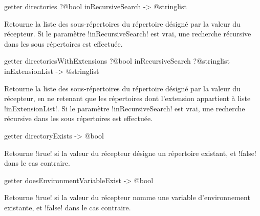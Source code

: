 
\begin{galgasbox}
getter directories ?@bool inRecursiveSearch -> @stringlist
\end{galgasbox}

Retourne la liste des sous-répertoires du répertoire désigné par la valeur du récepteur. Si le paramètre \ggs!inRecursiveSearch! est vrai, une recherche récursive dans les sous répertoires est effectuée.










\begin{galgasbox}
getter directoriesWithExtensions
    ?@bool inRecursiveSearch
    ?@stringlist inExtensionList -> @stringlist
\end{galgasbox}

Retourne la liste des sous-répertoires du répertoire désigné par la valeur du récepteur, en ne retenant que les répertoires dont l'extension appartient à liste \ggs!inExtensionList!. Si le paramètre \ggs!inRecursiveSearch! est vrai, une recherche récursive dans les sous répertoires est effectuée.









\begin{galgasbox}
getter directoryExists -> @bool
\end{galgasbox}

Retourne \ggs!true! si la valeur du récepteur désigne un répertoire existant, et \ggs!false! dans le cas contraire.









\begin{galgasbox}
getter doesEnvironmentVariableExist -> @bool
\end{galgasbox}

Retourne \ggs!true! si la valeur du récepteur nomme une variable d'environnement existante, et \ggs!false! dans le cas contraire.








